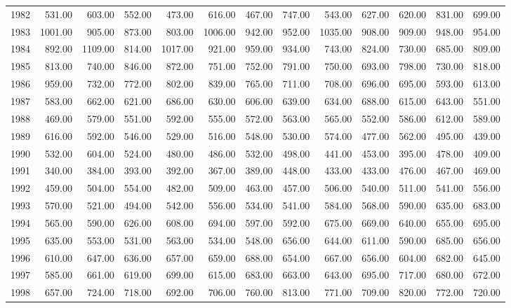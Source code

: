 \begin{longtable}{rrrrrrrrrrrrr}
  1982 & 531.00 & 603.00 & 552.00 & 473.00 & 616.00 & 467.00 & 747.00 & 543.00 & 627.00 & 620.00 & 831.00 & 699.00 \\ 
  1983 & 1001.00 & 905.00 & 873.00 & 803.00 & 1006.00 & 942.00 & 952.00 & 1035.00 & 908.00 & 909.00 & 948.00 & 954.00 \\ 
  1984 & 892.00 & 1109.00 & 814.00 & 1017.00 & 921.00 & 959.00 & 934.00 & 743.00 & 824.00 & 730.00 & 685.00 & 809.00 \\ 
  1985 & 813.00 & 740.00 & 846.00 & 872.00 & 751.00 & 752.00 & 791.00 & 750.00 & 693.00 & 798.00 & 730.00 & 818.00 \\ 
  1986 & 959.00 & 732.00 & 772.00 & 802.00 & 839.00 & 765.00 & 711.00 & 708.00 & 696.00 & 695.00 & 593.00 & 613.00 \\ 
  1987 & 583.00 & 662.00 & 621.00 & 686.00 & 630.00 & 606.00 & 639.00 & 634.00 & 688.00 & 615.00 & 643.00 & 551.00 \\ 
  1988 & 469.00 & 579.00 & 551.00 & 592.00 & 555.00 & 572.00 & 563.00 & 565.00 & 552.00 & 586.00 & 612.00 & 589.00 \\ 
  1989 & 616.00 & 592.00 & 546.00 & 529.00 & 516.00 & 548.00 & 530.00 & 574.00 & 477.00 & 562.00 & 495.00 & 439.00 \\ 
  1990 & 532.00 & 604.00 & 524.00 & 480.00 & 486.00 & 532.00 & 498.00 & 441.00 & 453.00 & 395.00 & 478.00 & 409.00 \\ 
  1991 & 340.00 & 384.00 & 393.00 & 392.00 & 367.00 & 389.00 & 448.00 & 433.00 & 433.00 & 476.00 & 467.00 & 469.00 \\ 
  1992 & 459.00 & 504.00 & 554.00 & 482.00 & 509.00 & 463.00 & 457.00 & 506.00 & 540.00 & 511.00 & 541.00 & 556.00 \\ 
  1993 & 570.00 & 521.00 & 494.00 & 542.00 & 556.00 & 534.00 & 541.00 & 584.00 & 568.00 & 590.00 & 635.00 & 683.00 \\ 
  1994 & 565.00 & 590.00 & 626.00 & 608.00 & 694.00 & 597.00 & 592.00 & 675.00 & 669.00 & 640.00 & 655.00 & 695.00 \\ 
  1995 & 635.00 & 553.00 & 531.00 & 563.00 & 534.00 & 548.00 & 656.00 & 644.00 & 611.00 & 590.00 & 685.00 & 656.00 \\ 
  1996 & 610.00 & 647.00 & 636.00 & 657.00 & 659.00 & 688.00 & 654.00 & 667.00 & 656.00 & 604.00 & 682.00 & 645.00 \\ 
  1997 & 585.00 & 661.00 & 619.00 & 699.00 & 615.00 & 683.00 & 663.00 & 643.00 & 695.00 & 717.00 & 680.00 & 672.00 \\ 
  1998 & 657.00 & 724.00 & 718.00 & 692.00 & 706.00 & 760.00 & 813.00 & 771.00 & 709.00 & 820.00 & 772.00 & 720.00 \\ 

\end{longtable}
